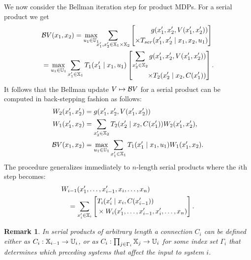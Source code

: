 \documentclass[conference]{IEEEtran}
\newtheorem{remark}{Remark}
\begin{document}
We now consider the Bellman iteration step for product MDPs. For a serial product we get
\begin{equation*}
\begin{aligned}
  & \bellman V (x_1, x_2) = \max_{u_1 \in \U_1} \hspace{-2mm} \sum_{x_1', x_2' \in \X_1 \times \X_2}  \left[ \begin{aligned}
  	g(x_1', x_2', V(x_1', x_2')) \\
  	\times T_{ser}(x_1', x_2' \mid x_1, x_2, u_1)
  \end{aligned} \right] \\
  & = \max_{u_1 \in \U_1} \sum_{x_1' \in \X_1}  T_1(x_1' \mid x_1, u_1 ) \left[ \begin{aligned}
   	\sum_{x_2' \in \X_2}  g(x_1', x_2', V(x_1', x_2')) \\
   	\times  T_2(x_2' \mid x_2, C(x_1'))
   \end{aligned} \right].
\end{aligned}
\end{equation*}
It follows that the Bellman update $V \mapsto \mathcal{B} V$ for a serial product can be computed in back-stepping fashion as follows:
\begin{equation*}
\begin{aligned}
  W_2(x_1', x_2') & = g(x_1', x_2', V(x_1', x_2')) \\
  W_1(x_1', x_2) & = \sum_{x_2' \in \mathbb{X}_2}  T_2(x_2' \mid x_2, C(x_1')) W_2(x_1', x_2'), \\
  \mathcal{B} V(x_1, x_2) & = \max_{u_1 \in \mathbb{U}_1} \sum_{x_1' \in \mathbb{X}_1} T_1(x_1' \mid x_1, u_1) W_1(x_1', x_2).
\end{aligned}
\end{equation*}
The procedure generalizes immediately to $n$-length serial products where the $i$th step becomes:
\begin{equation}
\label{eq:general_decomp}
\begin{aligned}
  & W_{i-1}(x_1', \ldots, x_{i-1}', x_i, \ldots, x_n) \\
  & \quad = \sum_{x_{i}' \in \X_{i}} \left[ \begin{aligned} & T_{i} (x_{i}' \mid x_{i}, C(x_{i-1}')) \\
   & \times W_{i} (x_1', \ldots, x_{i-1}', x_i', \ldots, x_n)
    \end{aligned} \right].
\end{aligned}
\end{equation}

\begin{remark}
  In serial products of arbitrary length a connection $C_i$ can be defined either as $C_i: \mathbb{X}_{i-1} \rightarrow \mathbb{U}_i$, or as $C_i: \prod_{j \in \Gamma_i} \mathbb{X}_j \rightarrow \mathbb{U}_i$ for some index set $\Gamma_i$ that determines which preceding systems that affect the input to system $i$.
\end{remark}
\end{document}
